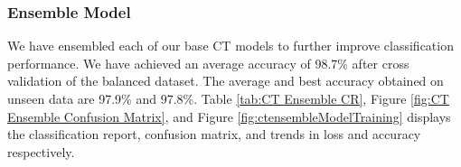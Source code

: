 \vspace{-3em}
\subsubsection{Ensemble Model}

We have ensembled each of our base CT models to further improve classification performance. We have achieved an average accuracy of 98.7\% after cross validation of the balanced dataset. The average and best accuracy obtained on unseen data are 97.9\% and 97.8\%. Table \ref{tab:CT Ensemble CR}, Figure \ref{fig:CT Ensemble Confusion Matrix}, and Figure \ref{fig:ctensembleModelTraining} displays the classification report, confusion matrix, and trends in loss and accuracy respectively.




